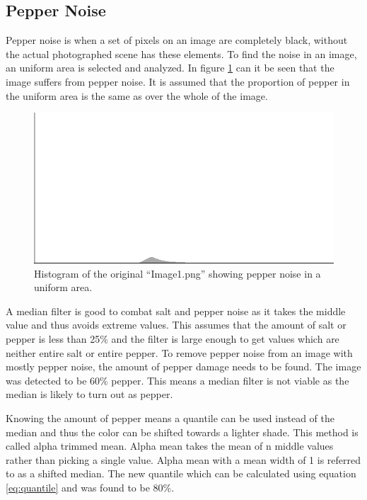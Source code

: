 \subsection{Pepper Noise}\label{image_1}
Pepper noise is when a set of pixels on an image are completely black, without the actual photographed scene has these elements.
To find the noise in an image, an uniform area is selected and analyzed.
In figure \ref{fig:hist_pepper_im01} can it be seen that the image suffers from pepper noise.
It is assumed that the proportion of pepper in the uniform area is the same as over the whole of the image.

\begin{figure}[H]
\centering
\includegraphics[width = \histogramWidth]{graphics/hist1_uniform.png}
\caption{Histogram of the original ``Image1.png'' showing pepper noise in a uniform area.}
\label{fig:hist_pepper_im01}
\end{figure}

A median filter is good to combat salt and pepper noise as it takes the middle value and thus avoids extreme values.
This assumes that the amount of salt or pepper is less than 25\% and the filter is large enough to get values which are neither entire salt or entire pepper.
To remove pepper noise from an image with mostly pepper noise, the amount of pepper damage needs to be found.
The image was detected to be 60\% pepper.
This means a median filter is not viable as the median is likely to turn out as pepper.

Knowing the amount of pepper means a quantile can be used instead of the median and thus the color can be shifted towards a lighter shade.
This method is called alpha trimmed mean.
Alpha mean takes the mean of n middle values rather than picking a single value.
Alpha mean with a mean width of 1 is referred to as a shifted median.
The new quantile which can be calculated using equation \ref{eq:quantile} and was found to be 80\%. 

